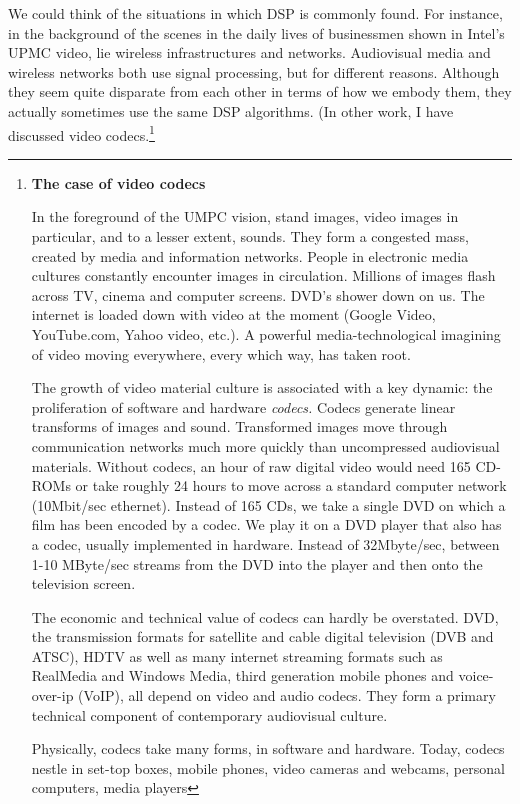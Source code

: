 We could think of the situations in which DSP is commonly found. For
instance, in the background of the scenes in the daily lives of
businessmen shown in Intel's UPMC video, lie wireless infrastructures
and networks. Audiovisual media and wireless networks both use signal
processing, but for different reasons. Although they seem quite
disparate from each other in terms of how we embody them, they actually
sometimes use the same DSP algorithms. (In other work, I have discussed
video codecs.\footnote{{\bf The case of video codecs}

In the foreground of the UMPC vision, stand
images, video images in particular, and to a lesser extent, sounds.
They form a congested mass, created by media and information networks.
People in electronic media cultures constantly encounter images in
circulation. Millions of images flash across TV, cinema and computer
screens. DVD's shower down on us. The internet is loaded down with
video at the moment (Google Video, YouTube.com, Yahoo video, etc.). A
powerful media{}-technological imagining of video moving everywhere,
every which way, has taken root. \par The growth of video material
culture is associated with a key dynamic: the proliferation of software
and hardware {\em codecs.} Codecs generate linear
transforms of images and sound. Transformed images move through
communication networks much more quickly than uncompressed audiovisual
materials. Without codecs, an hour of raw digital video would need 165
CD{}-ROMs or take roughly 24 hours to move across a standard computer
network (10Mbit/sec ethernet). Instead of 165 CDs, we take a single DVD
on which a film has been encoded by a codec. We play it on a DVD player
that also has a codec, usually implemented in hardware. Instead of
32Mbyte/sec, between 1{}-10 MByte/sec streams from the DVD into the
player and then onto the television screen. \par
The economic and technical value of codecs can hardly
be overstated. DVD, the transmission formats for satellite and cable
digital television (DVB and ATSC), HDTV as well as many internet
streaming formats such as RealMedia and Windows Media, third generation
mobile phones and voice{}-over{}-ip (VoIP), all depend on video and
audio codecs. They form a primary technical component of contemporary
audiovisual culture. \par Physically, codecs take many forms, in
software and hardware. Today, codecs nestle in set{}-top boxes, mobile
phones, video cameras and webcams, personal computers, media players
}
